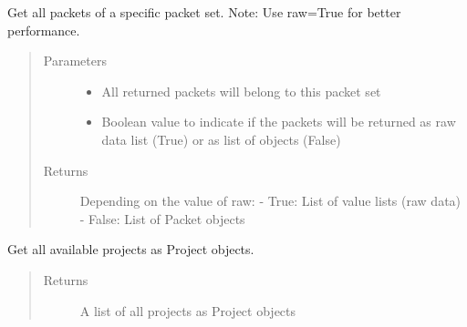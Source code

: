 \documentclass[letterpaper,10pt,english]{sphinxmanual}
\begin{document}
\begin{fulllineitems}

\begin{fulllineitems}
\label{\detokenize{src:src.Database.Database.getPacketsOfPacketSet}}
Get all packets of a specific packet set.
Note: Use raw=True for better performance.
\begin{quote}\begin{description}
\item[{Parameters}] \leavevmode\begin{itemize}
\item {} 
 \textendash{} All returned packets will belong to this packet set

\item {} 
 \textendash{} Boolean value to indicate if the packets will be returned as raw data list (True)
or as list of objects (False)

\end{itemize}

\item[{Returns}] \leavevmode
Depending on the value of raw:
- True: List of value lists (raw data)
- False: List of Packet objects

\end{description}\end{quote}

\end{fulllineitems}


\begin{fulllineitems}
\label{\detokenize{src:src.Database.Database.getProjects}}
Get all available projects as Project objects.
\begin{quote}\begin{description}
\item[{Returns}] \leavevmode
A list of all projects as Project objects

\end{description}\end{quote}

\end{fulllineitems}



\end{fulllineitems}
\end{document}
